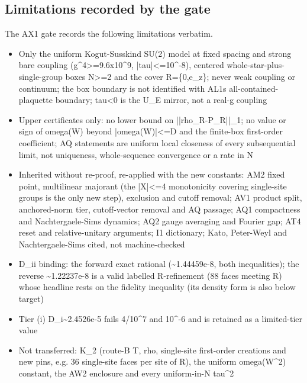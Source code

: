 \subsection{Limitations recorded by the gate}
\label{sec:ax1-limits}
The AX1 gate records the following limitations verbatim.
\begin{gatequote}
\begin{itemize}
\item Only the uniform Kogut-Susskind SU(2) model at fixed spacing and strong
bare coupling (g\textasciicircum{}4>=9.6x10\textasciicircum{}9,
|tau|<=10\textasciicircum{}-8), centered whole-star-plus-single-group boxes
N>=2 and the cover R=\{0,e\_z\}; never weak coupling or continuum; the box
boundary is not identified with AL1\textquotesingle{}s all-contained-plaquette
boundary; tau<0 is the U\_E mirror, not a real-g coupling
\item Upper certificates only: no lower bound on ||rho\_R-P\_R||\_1; no value
or sign of omega(W) beyond |omega(W)|<=D\textquotesingle{} and the finite-box
first-order coefficient; AQ statements are uniform local closeness of every
subsequential limit, not uniqueness, whole-sequence convergence or a rate in N
\item Inherited without re-proof, re-applied with the new constants: AM2 fixed
point, multilinear majorant (the |X|<=4 monotonicity covering single-site
groups is the only new step), exclusion and cutoff removal; AV1 product split,
anchored-norm tier, cutoff-vector removal and AQ passage; AQ1 compactness and
Nachtergaele-Sims dynamics; AQ2 gauge averaging and Fourier gap; AT4 reset and
relative-unitary arguments; I1 dictionary; Kato, Peter-Weyl and
Nachtergaele-Sims cited, not machine-checked
\item D\textquotesingle{}\_ii binding: the forward exact rational
(\textasciitilde{}1.44459e-8, both inequalities); the reverse
\textasciitilde{}1.22237e-8 is a valid labelled R-refinement (88 faces meeting
R) whose headline rests on the fidelity inequality (its density form is also
below target)
\item Tier (i) D\textquotesingle{}\_i\textasciitilde{}2.4526e-5 fails
4/10\textasciicircum{}7 and 10\textasciicircum{}-6 and is retained as a
limited-tier value
\item Not transferred: K\_2 (route-B T\textquotesingle{},
rho\textquotesingle{}, single-site first-order creations and new pins, e.g. 36
single-site faces per site of R), the uniform omega(W\textasciicircum{}2)
constant, the AW2 enclosure and every uniform-in-N tau\textasciicircum{}2

\end{itemize}
\end{gatequote}
